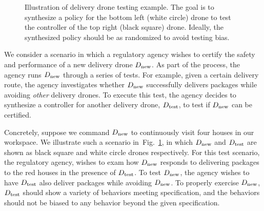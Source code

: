 
\begin{figure}
  \centering {}
  \caption{ Illustration of delivery drone testing example. The goal
    is to synthesize a policy for the bottom left (white circle) drone
    to test the controller of the top right (black square) drone. Ideally,
    the synthesized policy should be as randomized to avoid testing bias.\label{fig:motivating} }
\end{figure}

We consider a scenario in which a regulatory agency
wishes to certify the safety and performance of a new delivery drone ${D_{\text{new}}}$.
As part of the process, the agency runs ${D_{\text{new}}}$ through a series of tests. For example, given a certain
delivery route, the agency investigates whether ${D_{\text{new}}}$ successfully delivers packages while
avoiding \emph{other} delivery drones. To execute this test, the agency decides to
synthesize a controller for another delivery drone, ${D_{\text{test}}}$, to test if
${D_{\text{new}}}$ can be certified.

Concretely,
suppose we command
${D_{\text{new}}}$ to continuously visit four houses in our workspace.  We
illustrate such a scenario in~Fig.~\ref{fig:motivating}, in which
${D_{\text{new}}}$ and ${D_{\text{test}}}$ are shown as black square and white circle
drones respectively.  For this test scenario, the regulatory agency,
wishes to exam how ${D_{\text{new}}}$ responds to delivering packages to the
red houses in the presence of ${D_{\text{test}}}$. To test ${D_{\text{new}}}$, the
agency wishes to have ${D_{\text{test}}}$ also deliver packages while avoiding
${D_{\text{new}}}$. 
To properly exercise ${D_{\text{new}}}$, ${D_{\text{test}}}$ should show a variety of behaviors meeting  specification, and the behaviors should not be biased to any behavior beyond the given specification.  

